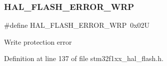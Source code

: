 \subsubsection{\texorpdfstring{H\+A\+L\+\_\+\+F\+L\+A\+S\+H\+\_\+\+E\+R\+R\+O\+R\+\_\+\+W\+RP}{HAL\_FLASH\_ERROR\_WRP}}
{\footnotesize\ttfamily \#define H\+A\+L\+\_\+\+F\+L\+A\+S\+H\+\_\+\+E\+R\+R\+O\+R\+\_\+\+W\+RP~0x02U}

Write protection error 

Definition at line 137 of file stm32f1xx\+\_\+hal\+\_\+flash.\+h.

